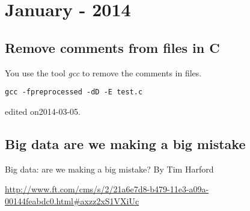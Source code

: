 \chapter[January - 2014]{January - 2014} %

\label{ch:jan:2014} %

\section{Remove comments from files in C}
You use the tool {\it gcc} to remove the comments in files.
\begin{verbatim}
gcc -fpreprocessed -dD -E test.c
\end{verbatim}

\hfill {\tiny edited on2014-03-05.}

\section{Big data  are we making a big mistake}
Big data: are we making a big mistake?
By Tim Harford

\url{http://www.ft.com/cms/s/2/21a6e7d8-b479-11e3-a09a-00144feabdc0.html#axzz2xS1VXiUc}

